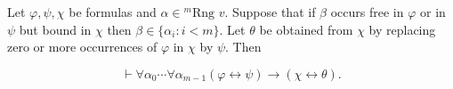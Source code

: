 Let $\varphi, \psi, \chi$ be formulas and $\alpha \in {}^m\text{Rng } v$. Suppose that if $\beta$ occurs free in $\varphi$ or in $\psi$ but bound in $\chi$ then $\beta \in \{ \alpha_i : i < m \}$. Let $\theta$ be obtained from $\chi$ by replacing zero or more occurrences of $\varphi$ in $\chi$ by $\psi$. Then

$$\vdash \forall \alpha_0 \cdots \forall \alpha_{m-1} (\varphi \leftrightarrow \psi) \rightarrow (\chi \leftrightarrow \theta).$$
